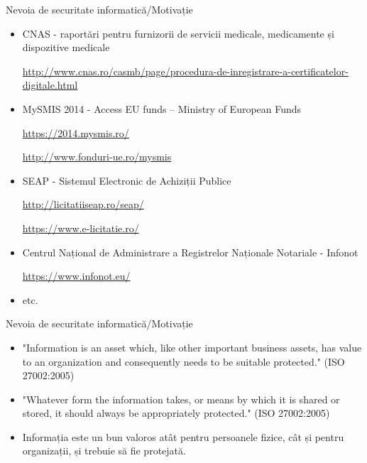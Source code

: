 \documentclass[pdf]{beamer}
\begin{document}
\begin{frame}{Nevoia de securitate informatică/Motivație}
\begin{itemize}
\item
CNAS - raportări pentru furnizorii de servicii medicale, medicamente și dispozitive medicale

\url{http://www.cnas.ro/casmb/page/procedura-de-inregistrare-a-certificatelor-digitale.html}

\item
MySMIS 2014 - Access EU funds – Ministry of European Funds

\url{https://2014.mysmis.ro/}

\url{http://www.fonduri-ue.ro/mysmis}

\item
SEAP - Sistemul Electronic de Achiziții Publice

\url{http://licitatiiseap.ro/seap/}

\url{https://www.e-licitatie.ro/}

\item
Centrul Național de Administrare a Registrelor Naționale Notariale - Infonot

\url{https://www.infonot.eu/}

\item
etc.

\end{itemize}
\end{frame}



\begin{frame}{Nevoia de securitate informatică/Motivație}
\begin{itemize}
\item
"Information is an asset which, like other important business assets, has value to an organization and consequently needs to be suitable protected." (ISO 27002:2005)

\item
"Whatever form the information takes, or means by which it is shared or stored, it should always be appropriately protected." (ISO 27002:2005)

\item
Informația este un bun valoros atât pentru persoanele fizice, cât și pentru organizații, și trebuie să fie protejată.
\end{itemize}
\end{frame}
\end{document}
